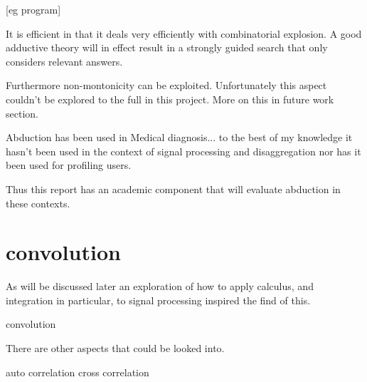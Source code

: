 [eg program]

It is efficient in that it deals very efficiently with combinatorial explosion. A good adductive theory will in effect result in a strongly guided search that only considers relevant answers.

Furthermore non-montonicity can be exploited. Unfortunately this aspect couldn't be explored to the full in this project. More on this in future work section.

Abduction has been used in Medical diagnosis... to the best of my knowledge it hasn't been used in the context of signal processing and disaggregation nor has it been used for profiling users.

Thus this report has an academic component that will evaluate abduction in these contexts.


\section{convolution}

As will be discussed later an exploration of how to apply calculus, and integration in particular, to signal processing inspired the find of this.

convolution



There are other aspects that could be looked into.

auto correlation
cross correlation